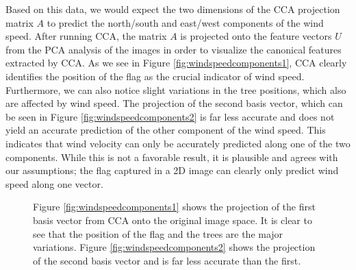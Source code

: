 Based on this data, we would expect the two dimensions of the CCA projection matrix $A$ to predict the north/south and east/west components of the wind speed. After running CCA, the matrix $A$ is projected onto the feature vectors $U$ from the PCA analysis of the images in order to visualize the canonical features extracted by CCA. As we see in Figure \ref{fig:windspeedcomponents1}, CCA clearly identifies the position of the flag as the crucial indicator of wind speed. Furthermore, we can also notice slight variations in the tree positions, which also are affected by wind speed. The projection of the second basis vector, which can be seen in Figure \ref{fig:windspeedcomponents2} is far less accurate and does not yield an accurate prediction of the other component of the wind speed. This indicates that wind velocity can only be accurately predicted along one of the two components. While this is not a favorable result, it is plausible and agrees with our assumptions; the flag captured in a 2D image can clearly only predict wind speed along one vector. 
\begin{figure}
	\centering
		\caption[CCA basis vectors for wind velocity projected onto the image space]{Figure \ref{fig:windspeedcomponents1} shows the projection of the first basis vector from CCA onto the original image space. It is clear to see that the position of the flag and the trees are the major variations. Figure \ref{fig:windspeedcomponents2} shows the projection of the second basis vector and is far less accurate than the first.}
\end{figure}

